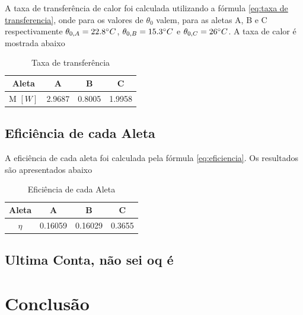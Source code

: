 \documentclass[12pt,openright,twoside,a4paper]{abntex2}
\begin{document}
A taxa de transferência de calor foi calculada utilizando a fórmula \eqref{eq:taxa de transferencia}, onde para os valores de \(\theta_0\) valem, para as aletas A, B e C respectivamente \(\theta_{0,A} = 22.8 \degree C\), \(\theta_{0, B} = 15.3 \degree C\) e \(\theta_{0,C} = 26 \degree C\). A taxa de calor é mostrada abaixo

\begin{table}[H]
	\caption{Taxa de transferência}
	\centering
	\begin{tabular}{c|c|c|c}
		\toprule
		Aleta                   & A      & B      & C      \\
		\midrule
		M \(\left[ W \right] \) & 2.9687 & 0.8005 & 1.9958 \\
		\bottomrule
	\end{tabular}
	\label{tab:valores_troca}
\end{table}

\section{Eficiência de cada Aleta}

A eficiência de cada aleta foi calculada pela fórmula \eqref{eq:eficiencia}. Os resultados são apresentados abaixo

\begin{table}[H]
	\caption{Eficiência de cada Aleta}
	\centering
	\begin{tabular}{c|c|c|c}
		\toprule
		Aleta    & A       & B       & C      \\
		\midrule
		\(\eta\) & 0.16059 & 0.16029 & 0.3655 \\
		\bottomrule
	\end{tabular}
	\label{tab:eficiencia}
\end{table}

\section{Ultima Conta, não sei oq é}

\chapter{Conclusão}\label{ch: conclusões}



\printbibliography[title={Referências}]
\end{document}
